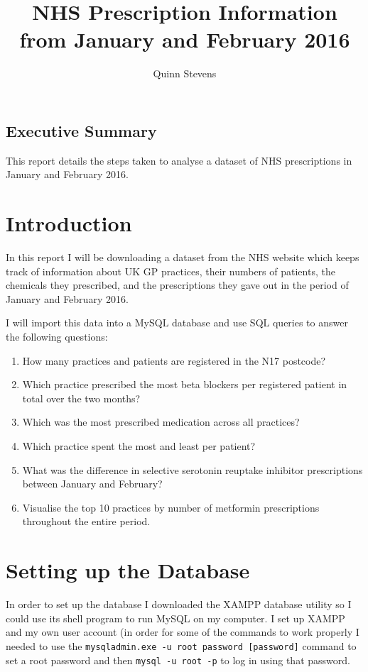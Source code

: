 \documentclass{report}
\author{Quinn Stevens}
\title{NHS Prescription Information from January and February 2016}
\begin{document}
\maketitle
\section*{Executive Summary}
This report details the steps taken to analyse a dataset of NHS prescriptions in January and February 2016.
\tableofcontents

\chapter{Introduction}
In this report I will be downloading a dataset from the NHS website which keeps track of information about UK GP practices, their numbers of patients, the chemicals they prescribed, and the prescriptions they gave out in the period of January and February 2016.

I will import this data into a MySQL database and use SQL queries to answer the following questions:
\begin{enumerate}
    \item How many practices and patients are registered in the N17 postcode?
    \item Which practice prescribed the most beta blockers per registered patient in total over the two months?
    \item Which was the most prescribed medication across all practices?
    \item Which practice spent the most and least per patient?
    \item What was the difference in selective serotonin reuptake inhibitor prescriptions between January and February?
    \item Visualise the top 10 practices by number of metformin prescriptions throughout the entire period.
\end{enumerate}

\chapter{Setting up the Database}

In order to set up the database I downloaded the XAMPP database utility \cite{xampp} so I could use its shell program to run MySQL on my computer. I set up XAMPP and my own user account (in order for some of the commands to work properly I needed to use the \texttt{mysqladmin.exe -u root password [password]} command to set a root password and then \texttt{mysql -u root -p} to log in using that password.
\end{document}
